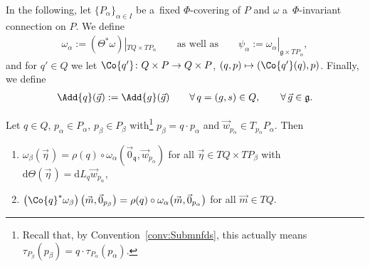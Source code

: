 In the following, let $\{P_\alpha\}_{\alpha\in I}$ be a~f\/ixed $\Phi$-covering of $P$ and $\omega$ a~$\Phi$-invariant
connection on $P$.
We def\/ine
\begin{gather*}
\omega_\alpha:=(\Theta^{*}\omega)|_{TQ\times TP_\alpha}\qquad\text{as well as}\qquad\psi_\alpha:=\omega_\alpha|_{\mathfrak{g}\times
TP_\alpha},
\end{gather*}
and for $q'\in Q$ we let $\Co{q'}\colon Q\times P\rightarrow Q\times P$, $(q,p)\mapsto \left(\Co{q'}(q),p\right)$. Finally, we define
\begin{gather*}
\Add{q}(\vec{g}):=\Add{g}(\vec{g})\qquad\forall\, q=(g,s)\in Q,\qquad \forall\, \vec{g}\in \mathfrak{g}.
\end{gather*}
\begin{Lemma}
\label{lemma:omegaalpha}
Let $q\in Q$, $p_\alpha\in P_\alpha$, $p_\beta\in P_\beta$ with\footnote{Recall that, by Convention~\ref{conv:Submnfds}, this actually means $\tau_{P_\beta}(p_\beta)=q\cdot
\tau_{P_\alpha}(p_\alpha)$.} $p_\beta=q\cdot p_\alpha$ and $\vec{w}_{p_\alpha}\in
T_{p_\alpha}P_\alpha$.
Then
\begin{enumerate}\itemsep=0pt
\item[$1)$]
$\omega_\beta(\vec{\eta}\hspace{1pt})=\rho(q)\circ \omega_\alpha(\vec{0}_\mathfrak{q},\vec{w}_{p_\alpha})$ for all $\vec{\eta}\in
TQ\times TP_\beta$ with $\mathrm{d}\Theta(\vec{\eta}\hspace{1pt})=\mathrm{d} L_q\vec{w}_{p_\alpha}$,
\item[$2)$]
$\left(\Co{q}^{*}\omega_\beta\right)\big(\vec{m},\vec{0}_{p_\beta}\big)=\rho(q)\circ
\omega_\alpha\big(\vec{m},\vec{0}_{p_\alpha}\big)$ for all $\vec{m}\in TQ$.
\end{enumerate}
\end{Lemma}

